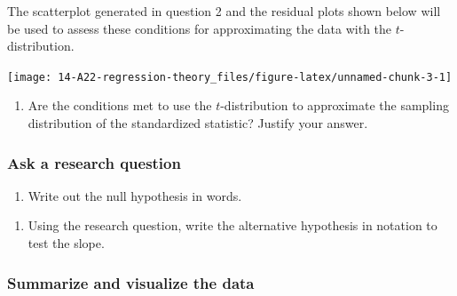 \documentclass[
]{report}
\providecommand{\tightlist}{%
  \setlength{\itemsep}{0pt}\setlength{\parskip}{0pt}}
\begin{document}
The scatterplot generated in question 2 and the residual plots shown below will be used to assess these conditions for approximating the data with the \(t\)-distribution.

\begin{center}\texttt{[image: 14-A22-regression-theory\_files/figure-latex/unnamed-chunk-3-1]} \end{center}

\begin{enumerate}
\def\labelenumi{\arabic{enumi}.}
\setcounter{enumi}{4}
\tightlist
\item
  Are the conditions met to use the \(t\)-distribution to approximate the sampling distribution of the standardized statistic? Justify your answer.
\end{enumerate}

\vspace{1.5in}

\hypertarget{ask-a-research-question-5}{%
\subsubsection*{Ask a research question}\label{ask-a-research-question-5}}

\begin{enumerate}
\def\labelenumi{\arabic{enumi}.}
\setcounter{enumi}{5}
\tightlist
\item
  Write out the null hypothesis in words.
\end{enumerate}

\vspace{1in}

\begin{enumerate}
\def\labelenumi{\arabic{enumi}.}
\setcounter{enumi}{6}
\tightlist
\item
  Using the research question, write the alternative hypothesis in notation to test the slope.
\end{enumerate}

\vspace{0.5in}

\hypertarget{summarize-and-visualize-the-data-5}{%
\subsubsection*{Summarize and visualize the data}\label{summarize-and-visualize-the-data-5}}
\end{document}
